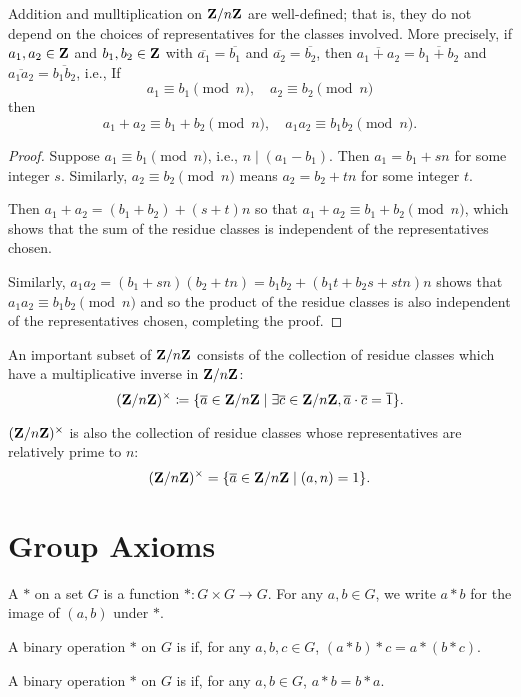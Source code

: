 \begin{theorem}
Addition and mulltiplication on $\mathbf Z/n\mathbf Z$ are well-defined; that is, they do not depend on the choices of representatives for the classes involved. More precisely, if $a_1,a_2\in\mathbf Z$ and $b_1,b_2\in\mathbf Z$ with $\overline{a_1}=\overline{b_1}$ and $\overline{a_2}=\overline{b_2}$, then $\overline{a_1+a_2}=\overline{b_1+b_2}$ and $\overline{a_1a_2}=\overline{b_1b_2}$, i.e., If
\[a_1\equiv b_1\pmod n,\quad a_2\equiv b_2\pmod n\]
then
\[a_1+a_2\equiv b_1+b_2\pmod n,\quad a_1a_2\equiv b_1b_2\pmod n.\]
\end{theorem}

\begin{proof}
Suppose $a_1\equiv b_1\pmod n$, i.e., $n\mid(a_1-b_1)$. Then $a_1=b_1+sn$ for some integer $s$. Similarly, $a_2\equiv b_2\pmod n$ means $a_2=b_2+tn$ for some integer $t$.

Then $a_1+a_2=(b_1+b_2)+(s+t)n$ so that $a_1+a_2\equiv b_1+b_2\pmod n$, which shows that the sum of the residue classes is independent of the representatives chosen.

Similarly, $a_1a_2=(b_1+sn)(b_2+tn)=b_1b_2+(b_1t+b_2s+stn)n$ shows that $a_1a_2\equiv b_1b_2\pmod n$ and so the product of the residue classes is also independent of the representatives chosen, completing the proof.
\end{proof}

An important subset of $\mathbf Z/n\mathbf Z$ consists of the collection of residue classes which have a multiplicative inverse in $\mathbf Z/n\mathbf Z$:
\[(\mathbf Z/n\mathbf Z)^\times\coloneqq\{\overline{a}\in\mathbf Z/n\mathbf Z\mid\exists\overline{c}\in\mathbf Z/n\mathbf Z,\overline{a}\cdot\overline{c}=\overline{1}\}.\]

\begin{proposition}
$(\mathbf Z/n\mathbf Z)^\times$ is also the collection of residue classes whose representatives are relatively prime to $n$:
\[(\mathbf Z/n\mathbf Z)^\times=\{\overline{a}\in\mathbf Z/n\mathbf Z\mid(a,n)=1\}.\]
\end{proposition}

\section{Group Axioms}
\begin{definition}
A  $\ast$ on a set $G$ is a function $\ast:G\times G\to G$. For any $a,b\in G$, we write $a \ast b$ for the image of $(a,b)$ under $\ast$.

A binary operation $\ast$ on $G$ is  if, for any $a,b,c\in G$, $(a \ast b) \ast c = a \ast (b \ast c)$.

A binary operation $\ast$ on $G$ is  if, for any $a, b \in G$, $a \ast b = b \ast a$.
\end{definition}

